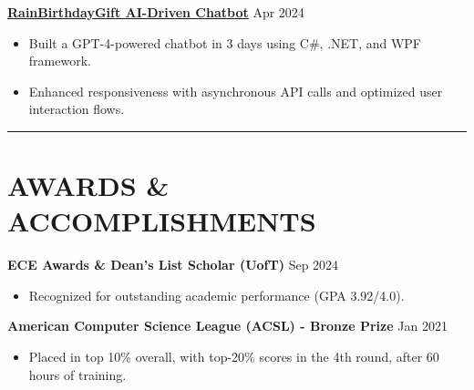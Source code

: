 \documentclass[a4paper,10pt]{article}
\begin{document}
\vspace{0.3cm}
\noindent\href{https://github.com/Ken-2511/RainBirthdayGift}{\uline{\textbf{RainBirthdayGift \textbar{} AI-Driven Chatbot}}} \hfill Apr 2024
\begin{itemize}[leftmargin=0.2in]
    \item Built a GPT-4-powered chatbot in 3 days using C\#, .NET, and WPF framework.
    \item Enhanced responsiveness with asynchronous API calls and optimized user interaction flows.
\end{itemize}

\noindent\rule{\linewidth}{1pt}

\section*{\textbf{AWARDS \& ACCOMPLISHMENTS}}

\noindent\textbf{ECE Awards \& Dean's List Scholar (UofT)} \hfill Sep 2024
\begin{itemize}[leftmargin=0.2in]
    \item Recognized for outstanding academic performance (GPA 3.92/4.0).
\end{itemize}

\vspace{0.3cm}
\noindent\textbf{American Computer Science League (ACSL) - Bronze Prize} \hfill Jan 2021
\begin{itemize}[leftmargin=0.2in]
    \item Placed in top 10\% overall, with top-20\% scores in the 4th round, after 60 hours of training.
\end{itemize}
\end{document}
